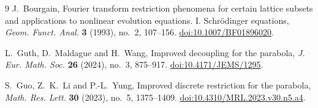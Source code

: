 \documentclass[11pt,twoside,a4paper]{article}
\numberwithin{equation}{section}
\theoremstyle{definition}
\begin{document}
\begin{thebibliography}{9}
J.~Bourgain, Fourier transform restriction phenomena for certain lattice subsets and applications to nonlinear evolution equations. I. Schr\"odinger equations,
\emph{Geom. Funct. Anal.} \textbf{3} (1993), no.~2, 107--156.
\href{https://doi.org/10.1007/BF01896020}{doi:10.1007/BF01896020}.

L.~Guth, D.~Maldague and H.~Wang, Improved decoupling for the parabola,
\emph{J. Eur. Math. Soc.} \textbf{26} (2024), no.~3, 875--917.
\href{https://doi.org/10.4171/JEMS/1295}{doi:10.4171/JEMS/1295}.

S.~Guo, Z.~K.~Li and P.-L.~Yung, Improved discrete restriction for the parabola,
\emph{Math. Res. Lett.} \textbf{30} (2023), no.~5, 1375--1409.
\href{https://doi.org/10.4310/MRL.2023.v30.n5.a4}{doi:10.4310/MRL.2023.v30.n5.a4}.
\end{thebibliography}
\end{document}
